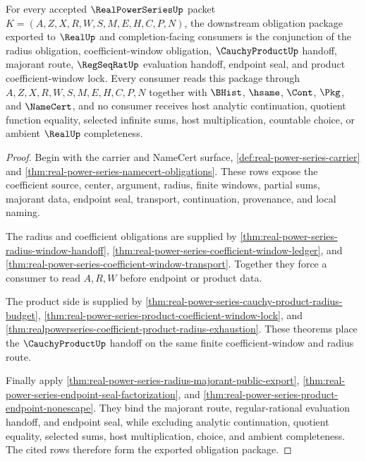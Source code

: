 \begin{theorem}
\label{thm:real-power-series-obligation-export}
For every accepted $\RealPowerSeriesUp$ packet $K=(A,Z,X,R,W,S,M,E,H,C,P,N)$, the downstream obligation package exported to $\RealUp$ and completion-facing consumers is the conjunction of the radius obligation, coefficient-window obligation, $\CauchyProductUp$ handoff, majorant route, $\RegSeqRatUp$ evaluation handoff, endpoint seal, and product coefficient-window lock. Every consumer reads this package through $A,Z,X,R,W,S,M,E,H,C,P,N$ together with $\BHist$, $\hsame$, $\Cont$, $\Pkg$, and $\NameCert$, and no consumer receives host analytic continuation, quotient function equality, selected infinite sums, host multiplication, countable choice, or ambient $\RealUp$ completeness.
\end{theorem}
\begin{proof}
Begin with the carrier and NameCert surface, \autoref{def:real-power-series-carrier} and \autoref{thm:real-power-series-namecert-obligations}. These rows expose the coefficient source, center, argument, radius, finite windows, partial sums, majorant data, endpoint seal, transport, continuation, provenance, and local naming.

The radius and coefficient obligations are supplied by \autoref{thm:real-power-series-radius-window-handoff}, \autoref{thm:real-power-series-coefficient-window-ledger}, and \autoref{thm:real-power-series-coefficient-window-transport}. Together they force a consumer to read $A,R,W$ before endpoint or product data.

The product side is supplied by \autoref{thm:real-power-series-cauchy-product-radius-budget}, \autoref{thm:real-power-series-product-coefficient-window-lock}, and \autoref{thm:realpowerseries-coefficient-product-radius-exhaustion}. These theorems place the $\CauchyProductUp$ handoff on the same finite coefficient-window and radius route.

Finally apply \autoref{thm:real-power-series-radius-majorant-public-export}, \autoref{thm:real-power-series-endpoint-seal-factorization}, and \autoref{thm:real-power-series-product-endpoint-nonescape}. They bind the majorant route, regular-rational evaluation handoff, and endpoint seal, while excluding analytic continuation, quotient equality, selected sums, host multiplication, choice, and ambient completeness. The cited rows therefore form the exported obligation package.
\end{proof}

